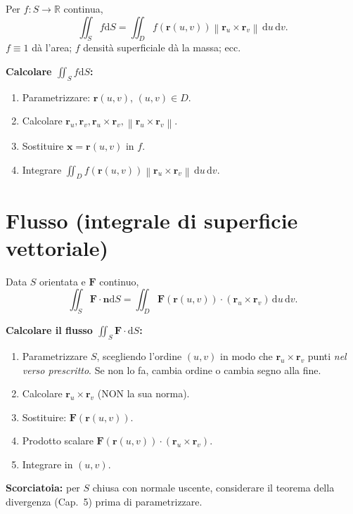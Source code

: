 \documentclass[11pt,a4paper,openany]{book}
\theoremstyle{plain}
\theoremstyle{definition}
\theoremstyle{remark}
\newcommand{\R}{\mathbb{R}}
\newcommand{\dd}{\,\mathrm{d}}
\renewcommand{\vec}[1]{\mathbf{#1}}
\newcommand{\F}{\mathbf{F}}
\newcommand{\rr}{\mathbf{r}}
\newcommand{\nn}{\mathbf{n}}
\newcommand{\dS}{\mathrm{d}S}
\newcommand{\norm}[1]{\left\lVert #1 \right\rVert}
\begin{document}
Per $f:S\to\R$ continua,
\begin{equation}
  \iint_S f\dS=\iint_D f(\rr(u,v))\norm{\rr_u\times\rr_v}\dd u\dd v.
  \label{eq:int-sup-scal}
\end{equation}
$f\equiv 1$ d\`a l'area; $f$ densit\`a superficiale d\`a la massa; ecc.

\begin{ricetta}
\textbf{Calcolare $\iint_S f\dS$:}
\begin{enumerate}[leftmargin=*]
  \item Parametrizzare: $\rr(u,v)$, $(u,v)\in D$.
  \item Calcolare $\rr_u,\rr_v,\rr_u\times\rr_v,\norm{\rr_u\times\rr_v}$.
  \item Sostituire $\vec{x}=\rr(u,v)$ in $f$.
  \item Integrare $\iint_D f(\rr(u,v))\norm{\rr_u\times\rr_v}\dd u\dd v$.
\end{enumerate}
\end{ricetta}

\section{Flusso (integrale di superficie vettoriale)}

Data $S$ orientata e $\F$ continuo,
\begin{equation}
  \iint_S\F\cdot\nn\dS=\iint_D\F(\rr(u,v))\cdot(\rr_u\times\rr_v)\dd u\dd v.
  \label{eq:flusso}
\end{equation}

\begin{ricetta}
\textbf{Calcolare il flusso $\iint_S\F\cdot\dS$:}
\begin{enumerate}[leftmargin=*]
  \item Parametrizzare $S$, scegliendo l'ordine $(u,v)$ in modo che
        $\rr_u\times\rr_v$ punti \emph{nel verso prescritto}. Se non lo fa,
        cambia ordine o cambia segno alla fine.
  \item Calcolare $\rr_u\times\rr_v$ (NON la sua norma).
  \item Sostituire: $\F(\rr(u,v))$.
  \item Prodotto scalare $\F(\rr(u,v))\cdot(\rr_u\times\rr_v)$.
  \item Integrare in $(u,v)$.
\end{enumerate}
\textbf{Scorciatoia:} per $S$ chiusa con normale uscente, considerare il
teorema della divergenza (Cap.~5) prima di parametrizzare.
\end{ricetta}
\end{document}
